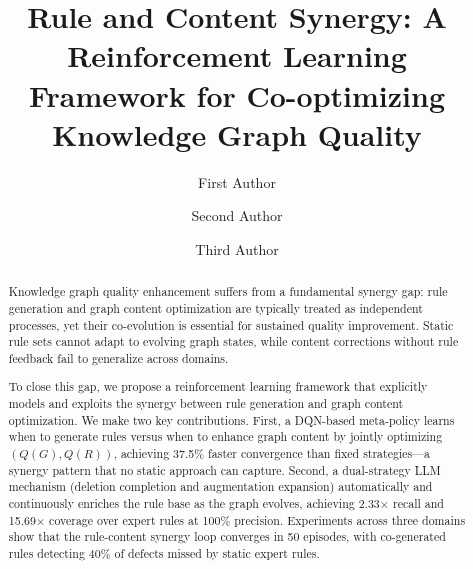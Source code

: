 \documentclass[runningheads]{llncs}
\begin{document}
\title{Rule and Content Synergy: A Reinforcement Learning Framework for Co-optimizing Knowledge Graph Quality}


\author{First Author \and
Second Author \and
Third Author}



\maketitle

\begin{abstract}
Knowledge graph quality enhancement suffers from a fundamental synergy gap: rule generation and graph content optimization are typically treated as independent processes, yet their co-evolution is essential for sustained quality improvement. Static rule sets cannot adapt to evolving graph states, while content corrections without rule feedback fail to generalize across domains. %

To close this gap, we propose a reinforcement learning framework that explicitly models and exploits the synergy between rule generation and graph content optimization. We make two key contributions. First, a DQN-based meta-policy learns when to generate rules versus when to enhance graph content by jointly optimizing $(Q(G), Q(R))$, achieving 37.5\% faster convergence than fixed strategies—a synergy pattern that no static approach can capture. Second, a dual-strategy LLM mechanism (deletion completion and augmentation expansion) automatically and continuously enriches the rule base as the graph evolves, achieving 2.33$\times$ recall and 15.69$\times$ coverage over expert rules at 100\% precision. Experiments across three domains show that the rule-content synergy loop converges in 50 episodes, with co-generated rules detecting 40\% of defects missed by static expert rules.

\end{abstract}
\end{document}
